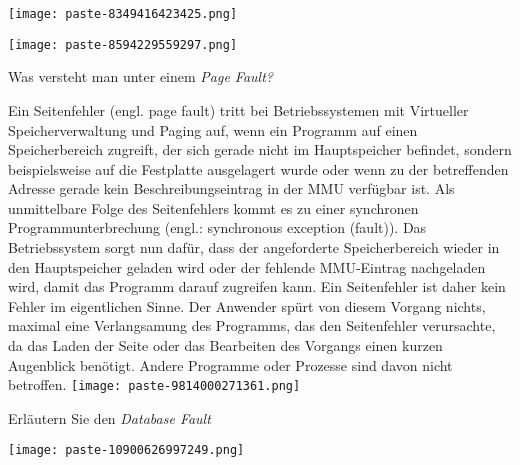 \documentclass{article}
\begin{document}
\begin{tcolorbox}[colback=white!10!white,colframe=lightgray!75!black,
  savelowerto=\jobname_ex.tex,breakable,enhanced,lines before break=40]

\begin{center}
 
\texttt{[image: paste-8349416423425.png]}
 

\end{center}

\tcblower

\justifying
\texttt{[image: paste-8594229559297.png]}

\end{tcolorbox}
\begin{tcolorbox}[colback=white!10!white,colframe=lightgray!75!black,
  savelowerto=\jobname_ex.tex,breakable,enhanced,lines before break=40]

\begin{center}
 Was versteht man unter einem 
\textit{Page Fault?
} 

\end{center}

\tcblower

\justifying
Ein Seitenfehler (engl. page fault) tritt bei Betriebssystemen mit Virtueller Speicherverwaltung und Paging auf, wenn ein Programm auf einen Speicherbereich zugreift, der sich gerade nicht im Hauptspeicher befindet, sondern beispielsweise auf die Festplatte ausgelagert wurde oder wenn zu der betreffenden Adresse gerade kein Beschreibungseintrag in der MMU verfügbar ist. Als unmittelbare Folge des Seitenfehlers kommt es zu einer synchronen Programmunterbrechung (engl.: synchronous exception (fault)). Das Betriebssystem sorgt nun dafür, dass der angeforderte Speicherbereich wieder in den Hauptspeicher geladen wird oder der fehlende MMU-Eintrag nachgeladen wird, damit das Programm darauf zugreifen kann. Ein Seitenfehler ist daher kein Fehler im eigentlichen Sinne. Der Anwender spürt von diesem Vorgang nichts, maximal eine Verlangsamung des Programms, das den Seitenfehler verursachte, da das Laden der Seite oder das Bearbeiten des Vorgangs einen kurzen Augenblick benötigt. Andere Programme oder Prozesse sind davon nicht betroffen.
\texttt{[image: paste-9814000271361.png]}

\end{tcolorbox}
\begin{tcolorbox}[colback=white!10!white,colframe=lightgray!75!black,
  savelowerto=\jobname_ex.tex,breakable,enhanced,lines before break=40]

\begin{center}
 Erläutern Sie den 
\textit{Database Fault
} 

\end{center}

\tcblower

\justifying
\texttt{[image: paste-10900626997249.png]}

\end{tcolorbox}
\end{document}
